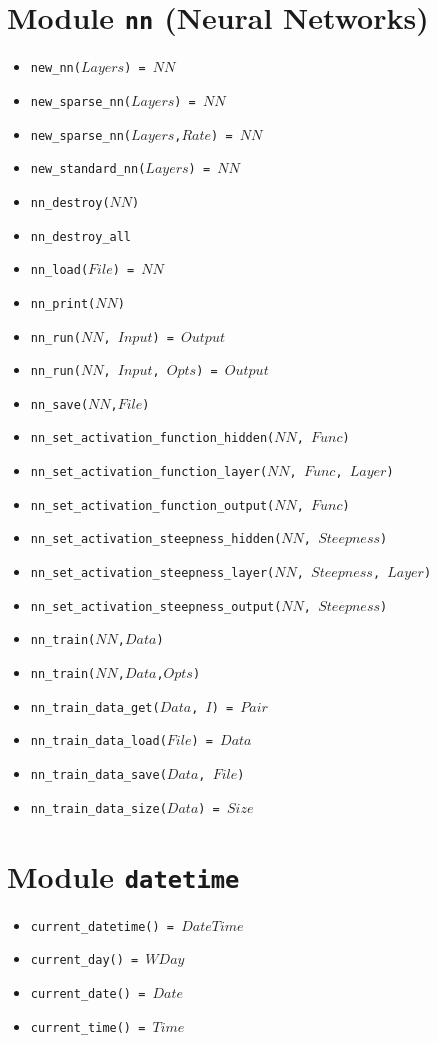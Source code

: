\documentclass[10pt]{article}
\newcommand{\ignore}[1]{}
\begin{document}
\begin{multicols}{2}
\section*{Module \texttt{nn} (Neural Networks)}
\begin{scriptsize}
\begin{itemize}
\item \texttt{new\_nn($Layers$) = $NN$}
\item \texttt{new\_sparse\_nn($Layers$) = $NN$}
\item \texttt{new\_sparse\_nn($Layers$,$Rate$) = $NN$}
\item \texttt{new\_standard\_nn($Layers$) = $NN$}
\item \texttt{nn\_destroy($NN$)}
\item \texttt{nn\_destroy\_all}
\item \texttt{nn\_load($File$) = $NN$}
\item \texttt{nn\_print($NN$)}
\item \texttt{nn\_run($NN$, $Input$) = $Output$}
\item \texttt{nn\_run($NN$, $Input$, $Opts$) = $Output$}
\item \texttt{nn\_save($NN$,$File$)}
\item \texttt{nn\_set\_activation\_function\_hidden($NN$, $Func$)}
\item \texttt{nn\_set\_activation\_function\_layer($NN$, $Func$, $Layer$)}
\item \texttt{nn\_set\_activation\_function\_output($NN$, $Func$)}
\item \texttt{nn\_set\_activation\_steepness\_hidden($NN$, $Steepness$)}
\item \texttt{nn\_set\_activation\_steepness\_layer($NN$, $Steepness$, $Layer$)}
\item \texttt{nn\_set\_activation\_steepness\_output($NN$, $Steepness$)}
\item \texttt{nn\_train($NN$,$Data$)}
\item \texttt{nn\_train($NN$,$Data$,$Opts$)}
\item \texttt{nn\_train\_data\_get($Data$, $I$) = $Pair$}
\item \texttt{nn\_train\_data\_load($File$) = $Data$}
\item \texttt{nn\_train\_data\_save($Data$, $File$)}
\item \texttt{nn\_train\_data\_size($Data$) = $Size$}
\end{itemize}
\end{scriptsize}
\section*{Module \texttt{datetime}}  
\begin{scriptsize}
\begin{itemize}
\item \texttt{current\_datetime() = $DateTime$}
\item \texttt{current\_day() = $WDay$}
\item \texttt{current\_date() = $Date$}
\item \texttt{current\_time() = $Time$}
\end{itemize}
\end{scriptsize}
\ignore{
}
\end{multicols}
\end{document}
